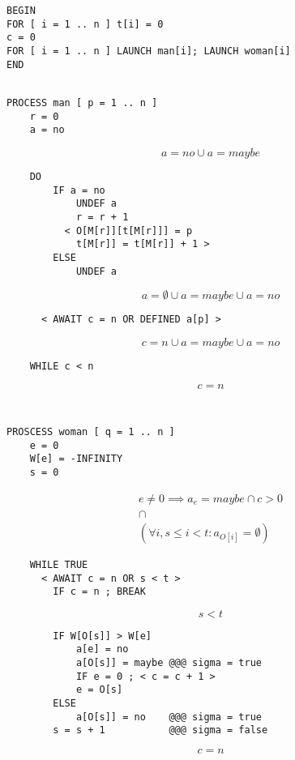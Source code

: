 \documentclass{article}
\begin{document}
\begin{verbatim}
BEGIN
FOR [ i = 1 .. n ] t[i] = 0
c = 0
FOR [ i = 1 .. n ] LAUNCH man[i]; LAUNCH woman[i]
END

\end{verbatim}
\newpage
\begin{verbatim}

PROCESS man [ p = 1 .. n ]
    r = 0
    a = no
\end{verbatim}
\begin{displaymath}
a = no \cup a = maybe
\end{displaymath}
\begin{verbatim}
    DO
        IF a = no
            UNDEF a
            r = r + 1
          < O[M[r]][t[M[r]]] = p
            t[M[r]] = t[M[r]] + 1 >
        ELSE
            UNDEF a
\end{verbatim}
\begin{displaymath}
a = \emptyset \cup a = maybe \cup a = no
\end{displaymath}
\begin{verbatim}
      < AWAIT c = n OR DEFINED a[p] >
\end{verbatim}
\begin{displaymath}
c = n \cup a = maybe \cup a = no
\end{displaymath}
\begin{verbatim}
    WHILE c < n
\end{verbatim}
\begin{displaymath}
c = n
\end{displaymath}
\begin{verbatim}

\end{verbatim}
\newpage
\begin{verbatim}

PROSCESS woman [ q = 1 .. n ]
    e = 0
    W[e] = -INFINITY
    s = 0
\end{verbatim}
\begin{displaymath}
\begin{matrix}
e \neq 0 \implies a_e = maybe \cap c > 0 \\
\cap \\
(\forall i, s \leq i < t : a_{O[i]} = \emptyset)
\end{matrix}
\end{displaymath}
\begin{verbatim}
    WHILE TRUE
      < AWAIT c = n OR s < t >
        IF c = n ; BREAK
\end{verbatim}
\begin{displaymath}
s < t
\end{displaymath}
\begin{verbatim}
        IF W[O[s]] > W[e]
            a[e] = no
            a[O[s]] = maybe @@@ sigma = true
            IF e = 0 ; < c = c + 1 >
            e = O[s]
        ELSE
            a[O[s]] = no    @@@ sigma = true
        s = s + 1           @@@ sigma = false
\end{verbatim}
\begin{displaymath}
c = n
\end{displaymath}
\end{document}
